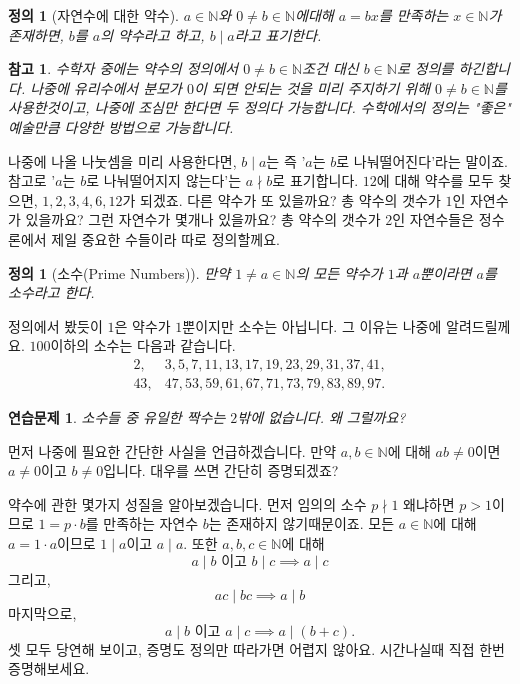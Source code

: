 \documentclass[a4paper, 11pt]{report}
\renewcommand{\<}{\langle}
\renewcommand{\>}{\rangle}
\newtheorem{dfn}[thm]{정의}
\newtheorem{remark}[thm]{참고}
\newtheorem{exercise}[thm]{연습문제}
\begin{document}
\begin{dfn}[자연수에 대한 약수]
  $a \in \mathbb{N}$와 $0 \neq b \in \mathbb{N}$에대해 $a = bx$를 만족하는 $x \in \mathbb{N}$가 존재하면, 
  $b$를 $a$의 약수라고 하고, $b \mid a$라고 표기한다.
\end{dfn}

\begin{remark}
  수학자 중에는 약수의 정의에서 $0 \neq b \in \mathbb{N}$조건 대신 $b \in \mathbb{N}$로 정의를 하긴합니다. 
  나중에 유리수에서 분모가 $0$이 되면 안되는 것을 미리 주지하기 위해 $0 \neq b \in \mathbb{N}$를 사용한것이고,
  나중에 조심만 한다면 두 정의다 가능합니다. 수학에서의 정의는 "좋은" 예술만큼 다양한 방법으로 가능합니다.
\end{remark}

나중에 나올 나눗셈을 미리 사용한다면, $b \mid a$는 즉 '$a$는 $b$로 나눠떨어진다'라는 말이죠. 
참고로 '$a$는 $b$로 나눠떨어지지 않는다'는 $a \nmid b$로 표기합니다. $12$에
대해 약수를 모두 찾으면, $1, 2, 3, 4, 6, 12$가 되겠죠. 다른 약수가 또 있을까요? 총 약수의 갯수가 $1$인 자연수가
있을까요? 그런 자연수가 몇개나 있을까요? 총 약수의 갯수가 $2$인 자연수들은 정수론에서 제일 중요한 수들이라 따로
정의할께요.

\begin{dfn}[소수(Prime Numbers)]
  만약 $1 \neq a \in \mathbb{N}$의 모든 약수가 $1$과 $a$뿐이라면 $a$를 소수라고 한다.
\end{dfn}

정의에서 봤듯이 $1$은 약수가 $1$뿐이지만 소수는 아닙니다. 그 이유는 나중에 알려드릴께요. $100$이하의 소수는 
다음과 같습니다.
\begin{align*}
2,& 3, 5, 7, 11, 13, 17, 19, 23, 29, 31, 37, 41,\\ 
43,& 47, 53, 59, 61, 67, 71, 73, 79, 83, 89, 97.
\end{align*}

\begin{exercise}
  소수들 중 유일한 짝수는 $2$밖에 없습니다. 왜 그럴까요? 
\end{exercise}

먼저 나중에 필요한 간단한 사실을 언급하겠습니다. 만약 $a, b \in \mathbb{N}$에 대해 $ab \neq 0$이면 $a \neq 0$이고 
$b \neq 0$입니다. 대우를 쓰면 간단히 증명되겠죠? 

약수에 관한 몇가지 성질을 알아보겠습니다. 먼저 임의의 소수 $p \nmid 1$ 왜냐하면 $p > 1$이므로 
$1 = p\cdot b$를 만족하는 자연수 $b$는 존재하지 않기때문이죠. 모든 $a \in \mathbb{N}$에
대해 $a = 1\cdot a$이므로 $1 \mid a$이고 $a \mid a$. 또한 $a, b, c \in \mathbb{N}$에 대해
\begin{equation}
a \mid b \text{ 이고 } b \mid c \implies a \mid c
\end{equation}
그리고,
\begin{equation}
ac \mid bc \implies a \mid b
\end{equation}
마지막으로,
\begin{equation}
a \mid b \text{ 이고 } a \mid c \implies a \mid (b+c).
\end{equation}
셋 모두 당연해 보이고, 증명도 정의만 따라가면 어렵지 않아요. 시간나실때 직접 한번 증명해보세요.
\end{document}
